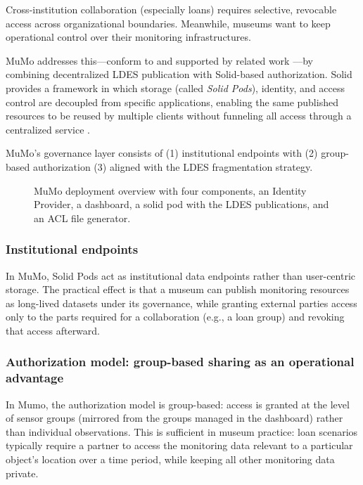 \documentclass{ceurart}
\begin{document}
Cross-institution collaboration (especially loans) requires selective,
revocable access across organizational boundaries. Meanwhile, museums
want to keep operational control over their monitoring infrastructures.

MuMo addresses this---conform to and supported by related work
\citep{slabbinck2023linked}---by combining decentralized LDES
publication with Solid-based authorization. Solid provides a framework
in which storage (called \emph{Solid Pods}), identity, and access
control are decoupled from specific applications, enabling the same
published resources to be reused by multiple clients without funneling
all access through a centralized service
\citep{solidprotocol2022, solid_24, solid_25}.

MuMo's governance layer consists of (1) institutional endpoints with (2)
group-based authorization (3) aligned with the LDES fragmentation
strategy.

\begin{figure}
\centering

\caption{MuMo deployment overview with four components, an Identity
Provider, a dashboard, a solid pod with the LDES publications, and an
ACL file generator.}\label{fig:deploy-overview}
\end{figure}

\subsubsection{Institutional endpoints}\label{institutional-endpoints}

In MuMo, Solid Pods act as institutional data endpoints rather than
user-centric storage. The practical effect is that a museum can publish
monitoring resources as long-lived datasets under its governance, while
granting external parties access only to the parts required for a
collaboration (e.g., a loan group) and revoking that access afterward.

\subsubsection{Authorization model: group-based sharing as an
operational
advantage}\label{authorization-model-group-based-sharing-as-an-operational-advantage}

In Mumo, the authorization model is group-based: access is granted at
the level of sensor groups (mirrored from the groups managed in the
dashboard) rather than individual observations. This is sufficient in
museum practice: loan scenarios typically require a partner to access
the monitoring data relevant to a particular object's location over a
time period, while keeping all other monitoring data private.
\end{document}
